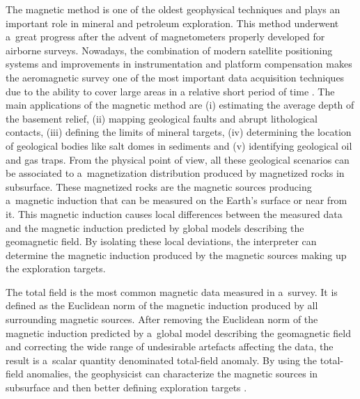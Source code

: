 \documentclass[journal abbreviation, npg]{copernicus}
\begin{document}
\introduction The magnetic method is one of the oldest geophysical techniques
and plays an important role in mineral and petroleum exploration. This method
underwent a~great progress after the advent of magnetometers properly
developed for airborne surveys. Nowadays, the combination of modern satellite
positioning systems and improvements in instrumentation and platform
compensation makes the aeromagnetic survey one of the most important 
data acquisition techniques due to the ability to cover large areas in a 
relative short period of time \citep{blakely1996,nabighian-etal2005}. 
The main applications
of the magnetic method are (i) estimating the average depth of the basement
relief, (ii) mapping geological faults and abrupt lithological contacts,
(iii) defining the limits of mineral targets, (iv) determining the location
of geological bodies like salt domes in sediments and (v) identifying
geological oil and gas traps. From the physical point of view, all these
geological scenarios can be associated to a~magnetization distribution
produced by magnetized rocks in subsurface. These magnetized rocks are the
magnetic sources producing a~magnetic induction that can be measured on the
Earth's surface or near from it. This magnetic induction causes local
differences between the measured data and the magnetic induction predicted by
global models describing the geomagnetic field. By isolating these local
deviations, the interpreter can determine the magnetic induction produced by
the magnetic sources making up the exploration targets.

The total field is the most common magnetic data measured in a~survey. It is
defined as the Euclidean norm of the magnetic induction produced by all
surrounding magnetic sources. After removing the Euclidean norm of the
magnetic induction predicted by a~global model describing the geomagnetic
field and correcting the wide range of undesirable artefacts affecting the
data, the result is a~scalar quantity denominated total-field anomaly. By 
using the total-field
anomalies, the geophysicist can characterize the magnetic sources in
subsurface and then better defining exploration targets
\citep{telford-etal1990,blakely1996}.
\end{document}

